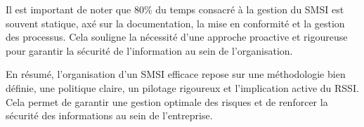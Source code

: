 Il est important de noter que 80\% du temps consacré à la gestion du SMSI est souvent statique, axé sur la documentation, la mise en conformité et la gestion des processus. Cela souligne la nécessité d'une approche proactive et rigoureuse pour garantir la sécurité de l'information au sein de l'organisation.

En résumé, l'organisation d'un SMSI efficace repose sur une méthodologie bien définie, une politique claire, un pilotage rigoureux et l'implication active du RSSI. Cela permet de garantir une gestion optimale des risques et de renforcer la sécurité des informations au sein de l'entreprise.








